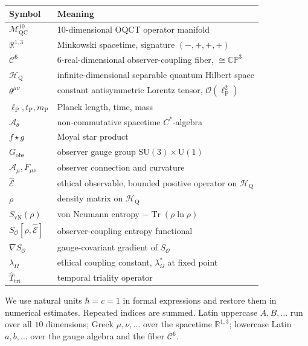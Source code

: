 \documentclass[11pt,a4paper]{article}
\theoremstyle{myrmk}
\newcommand{\Mmanifold}{\mathcal{M}^{10}_{\mathrm{QC}}}
\newcommand{\SO}{\nabla S_{\!\mathcal{O}}}
\newcommand{\lP}{\ell_{\mathrm{P}}}
\newcommand{\tP}{t_{\mathrm{P}}}
\newcommand{\mP}{m_{\mathrm{P}}}
\newcommand{\cC}{\mathcal{C}^{6}}
\newcommand{\HH}{\mathcal{H}_{\mathrm{Q}}}
\newcommand{\Tr}{\operatorname{Tr}}
\newcommand{\Ehat}{\hat{\mathcal{E}}}
\begin{document}
\begin{table}[H]
\centering\small
\renewcommand{\arraystretch}{1.18}
\begin{tabular}{p{3.0cm}p{11.2cm}}
\toprule
\textbf{Symbol} & \textbf{Meaning} \\ \midrule
$\Mmanifold$              & 10-dimensional OQCT operator manifold \\
$\mathbb{R}^{1,3}$        & Minkowski spacetime, signature $(-,+,+,+)$ \\
$\cC$                     & 6-real-dimensional observer-coupling fiber, $\cong\mathbb{CP}^3$ \\
$\HH$                     & infinite-dimensional separable quantum Hilbert space \\
$\theta^{\mu\nu}$         & constant antisymmetric Lorentz tensor, $\mathcal{O}(\lP^2)$ \\
$\lP,\tP,\mP$             & Planck length, time, mass \\
$\mathcal{A}_\theta$      & non-commutative spacetime $C^*$-algebra \\
$f\star g$                & Moyal star product \\
$G_{\mathrm{obs}}$        & observer gauge group $\mathrm{SU}(3)\times\mathrm{U}(1)$ \\
$\mathcal{A}_\mu,F_{\mu\nu}$ & observer connection and curvature \\
$\Ehat$                   & ethical observable, bounded positive operator on $\HH$ \\
$\rho$                    & density matrix on $\HH$ \\
$S_{\mathrm{vN}}(\rho)$   & von Neumann entropy $-\Tr(\rho\ln\rho)$ \\
$S_{\mathcal{O}}[\rho,\Ehat]$ & observer-coupling entropy functional \\
$\SO$                     & gauge-covariant gradient of $S_{\mathcal{O}}$ \\
$\lambda_\Omega$          & ethical coupling constant, $\lambda_\Omega^*$ at fixed point \\
$\hat T_{\mathrm{tri}}$   & temporal triality operator \\
\bottomrule
\end{tabular}
\end{table}

\noindent We use natural units $\hbar=c=1$ in formal expressions and restore them in
numerical estimates. Repeated indices are summed. Latin uppercase $A,B,\ldots$ run over
all $10$ dimensions; Greek $\mu,\nu,\ldots$ over the spacetime $\mathbb{R}^{1,3}$;
lowercase Latin $a,b,\ldots$ over the gauge algebra and the fiber $\cC$.
\end{document}

